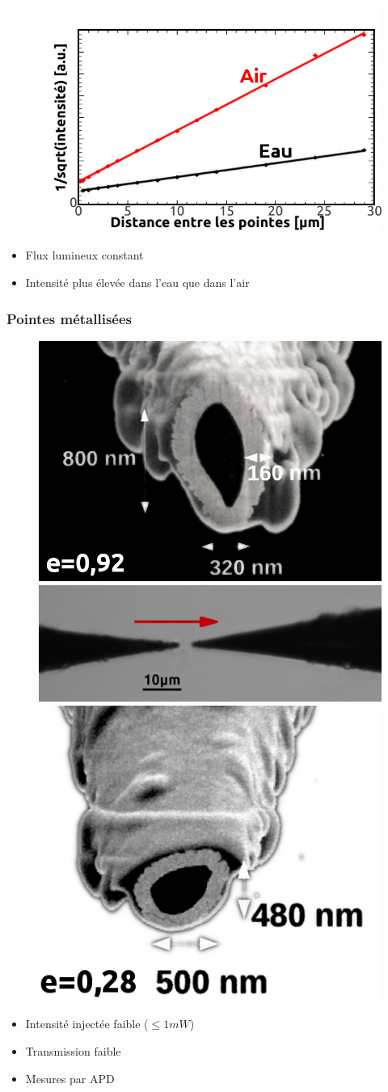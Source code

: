 \documentclass[9pt,a9paper,handout]{beamer}
\begin{document}
\begin{frame}
\begin{itemize}
\begin{figure}[c]
                    \includegraphics[height=0.202\textwidth]{Images/Scans/NuesDistanceIntensite}
                \end{figure}
                \vspace*{-5mm}
                \begin{itemize}
                    \item Flux lumineux constant 
                    \vspace*{1mm}
                    \item Intensité plus élevée dans l'eau que dans l'air
                \end{itemize}
        \end{itemize}
    \end{frame}


    \begin{frame}    
        \frametitle{Pointes métallisées}
        \begin{figure}[c]\centering
            \includegraphics[height=0.14\textwidth]{Images/PhotosPointes/pointe_metallisee_injection}
            \;
            \includegraphics[height=0.14\textwidth]{Images/PhotosPointes/pointes_metallisees}
            \;
            \includegraphics[height=0.14\textwidth]{Images/PhotosPointes/pointe_metallisee_mesure}
        \end{figure}
        \begin{itemize}
            \item Intensité injectée faible ($\leq 1mW$)
            \item Transmission faible
            \item Mesures par APD
        \end{itemize}
    

    \end{frame}
\end{document}
